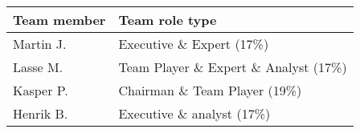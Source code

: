 \begin{table}
    \centering
    \begin{tabular}{l|l}
        \rowcolor{Gray}
        \textbf{Team member} & \textbf{Team role type}\\\hline
        Martin J.            & Executive \& Expert (17\%) \\
        Lasse M.             & Team Player \& Expert \& Analyst (17\%) \\
        Kasper P.            & Chairman \& Team Player (19\%) \\
        Henrik B.            & Executive \& analyst (17\%)
    \end{tabular}
    \label{tab:roleTypes}
\end{table}
